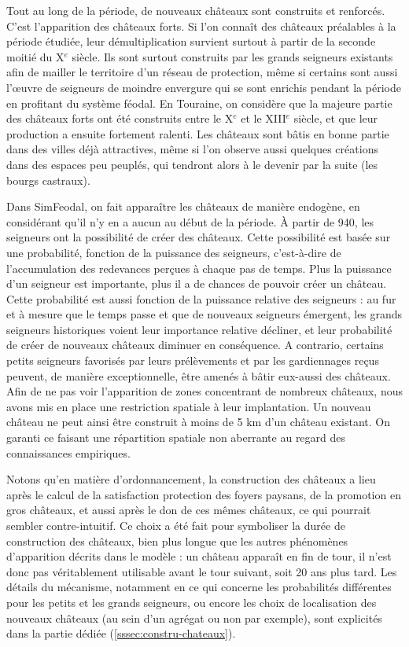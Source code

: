 Tout au long de la période, de nouveaux châteaux sont construits et renforcés. C'est l'apparition des \og châteaux forts\fg{}.
Si l'on connaît des châteaux préalables à la période étudiée, leur démultiplication survient surtout à partir de la seconde moitié du X$^e$ siècle.
Ils sont surtout construits par les grands seigneurs existants afin de mailler le territoire d'un réseau de protection, même si certains sont aussi l'œuvre de seigneurs de moindre envergure qui se sont enrichis pendant la période en profitant du système féodal.
En Touraine, on considère que la majeure partie des châteaux forts ont été construits entre le X$^e$ et le XIII$^e$ siècle, et que leur production a ensuite fortement ralenti.
Les châteaux sont bâtis en bonne partie dans des villes déjà attractives, même si l'on observe aussi quelques créations dans des espaces peu peuplés, qui tendront alors à le devenir par la suite (les bourgs castraux).


Dans SimFeodal, on fait apparaître les châteaux de manière endogène, en considérant qu'il n'y en a aucun au début de la période.
À partir de 940, les seigneurs ont la possibilité de créer des châteaux.
Cette possibilité est basée sur une probabilité, fonction de la puissance des seigneurs, c'est-à-dire de l'accumulation des redevances perçues à chaque pas de temps.
Plus la puissance d'un seigneur est importante, plus il a de chances de pouvoir créer un château.
Cette probabilité est aussi fonction de la puissance relative des seigneurs : au fur et à mesure que le temps passe et que de nouveaux seigneurs émergent, les grands seigneurs historiques voient leur importance relative décliner, et leur probabilité de créer de nouveaux châteaux diminuer en conséquence.
A contrario, certains petits seigneurs favorisés par leurs prélèvements et par les gardiennages reçus peuvent, de manière exceptionnelle, être amenés à bâtir eux-aussi des châteaux.
Afin de ne pas voir l'apparition de zones concentrant de nombreux châteaux, nous avons mis en place une restriction spatiale à leur implantation.
Un nouveau château ne peut ainsi être construit à moins de 5 km d'un château existant.
On garanti ce faisant une répartition spatiale non aberrante au regard des connaissances empiriques.

Notons qu'en matière d'ordonnancement, la construction des châteaux a lieu après le calcul de la satisfaction protection des foyers paysans, de la promotion en gros châteaux, et aussi après le don de ces mêmes châteaux, ce qui pourrait sembler contre-intuitif.
Ce choix a été fait pour symboliser la durée de construction des châteaux, bien plus longue que les autres phénomènes d'apparition décrits dans le modèle : un château apparaît en fin de tour, il n'est donc pas véritablement utilisable avant le tour suivant, soit 20 ans plus tard.
Les détails du mécanisme, notamment en ce qui concerne les probabilités différentes pour les petits et les grands seigneurs, ou encore les choix de localisation des nouveaux châteaux (au sein d'un agrégat ou non par exemple), sont explicités dans la partie dédiée (\cref{sssec:constru-chateaux}).

